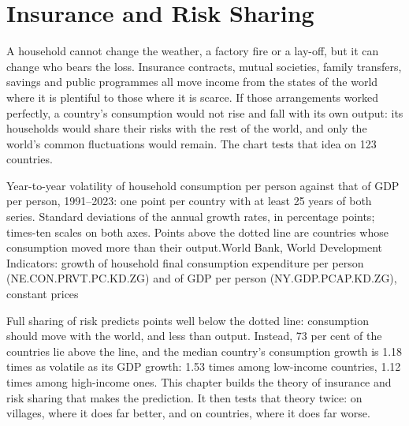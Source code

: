 \chapter{Insurance and Risk Sharing}\label{ch:b2:insurance-and-risk-sharing}

A household cannot change the weather, a factory fire or a lay-off, but it can change who bears the
loss. Insurance contracts, mutual societies, family transfers, savings and public programmes all move
income from the states of the world where it is plentiful to those where it is scarce. If those
arrangements worked perfectly, a country's consumption would not rise and fall with its own output:
its households would share their risks with the rest of the world, and only the world's common
fluctuations would remain. The chart tests that idea on 123 countries.

\begin{openingchart}{Year-to-year volatility of household consumption per person against that of GDP
  per person, 1991--2023: one point per country with at least 25 years of both series. Standard
  deviations of the annual growth rates, in percentage points; times-ten scales on both axes. Points
  above the dotted line are countries whose consumption moved more than their output.}{World Bank,
  World Development Indicators: growth of household final consumption expenditure per person
  (NE.CON.PRVT.PC.KD.ZG) and of GDP per person (NY.GDP.PCAP.KD.ZG), constant prices}
\end{openingchart}

Full sharing of risk predicts points well below the dotted line: consumption should move with the
world, and less than output. Instead, 73 per cent of the countries lie above the line, and the median
country's consumption growth is 1.18 times as volatile as its GDP growth: 1.53 times among low-income
countries, 1.12 times among high-income ones. This chapter builds the theory of insurance and risk sharing that makes the
prediction. It then tests that theory twice: on villages, where it does far better, and on countries,
where it does far worse.

